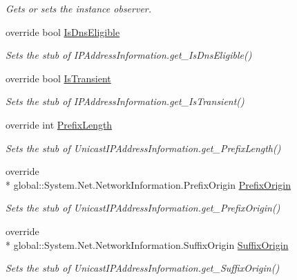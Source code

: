 \begin{DoxyCompactItemize}
\begin{DoxyCompactList}\small\item\em Gets or sets the instance observer.\end{DoxyCompactList}\item 
override bool \hyperlink{class_system_1_1_net_1_1_network_information_1_1_fakes_1_1_stub_unicast_i_p_address_information_a65dbc6d89cdefc280b12cdb5d7621525}{Is\-Dns\-Eligible}
\begin{DoxyCompactList}\small\item\em Sets the stub of I\-P\-Address\-Information.\-get\-\_\-\-Is\-Dns\-Eligible()\end{DoxyCompactList}\item 
override bool \hyperlink{class_system_1_1_net_1_1_network_information_1_1_fakes_1_1_stub_unicast_i_p_address_information_a76dd507114d01bd71a266172b0fe8048}{Is\-Transient}
\begin{DoxyCompactList}\small\item\em Sets the stub of I\-P\-Address\-Information.\-get\-\_\-\-Is\-Transient()\end{DoxyCompactList}\item 
override int \hyperlink{class_system_1_1_net_1_1_network_information_1_1_fakes_1_1_stub_unicast_i_p_address_information_a0765eabeb45dfd45c2eb4a0dcd0b8c74}{Prefix\-Length}
\begin{DoxyCompactList}\small\item\em Sets the stub of Unicast\-I\-P\-Address\-Information.\-get\-\_\-\-Prefix\-Length()\end{DoxyCompactList}\item 
override \\*
global\-::\-System.\-Net.\-Network\-Information.\-Prefix\-Origin \hyperlink{class_system_1_1_net_1_1_network_information_1_1_fakes_1_1_stub_unicast_i_p_address_information_a8a5fb8a3992ad9942164c1f329906c2c}{Prefix\-Origin}
\begin{DoxyCompactList}\small\item\em Sets the stub of Unicast\-I\-P\-Address\-Information.\-get\-\_\-\-Prefix\-Origin()\end{DoxyCompactList}\item 
override \\*
global\-::\-System.\-Net.\-Network\-Information.\-Suffix\-Origin \hyperlink{class_system_1_1_net_1_1_network_information_1_1_fakes_1_1_stub_unicast_i_p_address_information_a8e33b78739b68f03417186388344d225}{Suffix\-Origin}
\begin{DoxyCompactList}\small\item\em Sets the stub of Unicast\-I\-P\-Address\-Information.\-get\-\_\-\-Suffix\-Origin()\end{DoxyCompactList}\end{DoxyCompactItemize}


